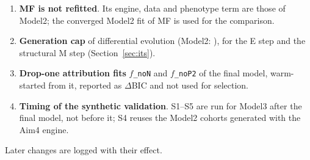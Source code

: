 \documentclass[11pt]{article}
\begin{document}
\begin{enumerate}
\item \textbf{MF is not refitted}. Its engine, data and phenotype term are those of Model2; the converged Model2 fit of MF is used for the comparison.
\item \textbf{Generation cap} of differential evolution \valDeMaxGen{} (Model2: \valMaxGenModelTwo), for the E step and the structural M step (Section~\ref{sec:its}).
\item \textbf{Drop-one attribution fits} $f$\texttt{\_noN} and $f$\texttt{\_noP2} of the final model, warm-started from it, reported as $\Delta$BIC and not used for selection.
\item \textbf{Timing of the synthetic validation}. S1--S5 are run for Model3 after the final model, not before it; S4 reuses the Model2 cohorts generated with the Aim4 engine.
\end{enumerate}
Later changes are logged with their effect.



\end{document}
